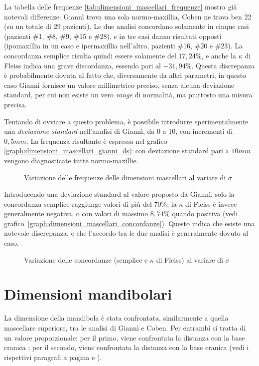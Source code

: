 La tabella delle frequenze \vref{tab:dimensioni_mascellari_frequenze} mostra già notevoli differenze: Giannì trova una sola normo-maxillia, Coben ne trova ben 22 (su un totale di 29 pazienti). Le due analisi concordano solamente in cinque casi (pazienti \#1, \#8, \#9, \#15 e \#28), e in tre casi danno risultati opposti (ipomaxillia in un caso e ipermaxillia nell'altro, pazienti \#16, \#20 e \#23). La concordanza semplice risulta quindi essere solamente del $17,24\%$, e anche la $\kappa$ di Fleiss indica una grave discordanza, essendo pari al $-31,94\%$. Questa discrepanza è probabilmente dovuta al fatto che, diversamente da altri parametri, in questo caso Giannì fornisce un valore millimetrico preciso, senza alcuna deviazione standard, per cui non esiste un vero \emph{range} di normalità, ma piuttosto una misura precisa.

Tentando di ovviare a questo problema, è possibile introdurre sperimentalmente una \emph{deviazione standard} nell'analisi di Giannì, da 0 a 10, con incrementi di $0,5 mm$. La frequenza risultante è espressa nel grafico \vref{graph:dimensioni_mascellari_gianni_ds}: con deviazione standard pari a $10 mm$ vengono diagnosticate tutte normo-maxillie.

\begin{figure}[ht!]
\centering

\caption{Variazione delle frequenze delle dimensioni mascellari al variare di $\sigma$}
\label{graph:dimensioni_mascellari_gianni_ds}
\end{figure}

Introducendo una deviazione standard al valore proposto da Giannì, solo la concordanza semplice raggiunge valori di più del $70\%$; la $\kappa$ di Fleiss è invece generalmente negativa, o con valori di massimo $8,74\%$ quando positiva (vedi grafico~\vref{graph:dimensioni_mascellari_concordanze}). Questo indica che esiste una notevole discrepanza, e che l'accordo tra le due analisi è generalmente dovuto al caso.

\begin{figure}[ht!]
\centering

\caption{Variazione delle concordanze (semplice e $\kappa$ di Fleiss) al variare di $\sigma$}
\label{graph:dimensioni_mascellari_concordanze}
\end{figure}

\section{Dimensioni mandibolari}
La dimensione della mandibola è stata confrontata, similarmente a quella mascellare superiore, tra le analisi di Giannì e Coben. Per entrambi si tratta di un valore proporzionale: per il primo, viene confrontata la distanza  con la base cranica ; per il secondo, viene confrontata la distanza  con la base cranica  (vedi i rispettivi paragrafi a pagina \pageref{sec:giannì_mandibola} e \pageref{sec:coben_mandibola}).

